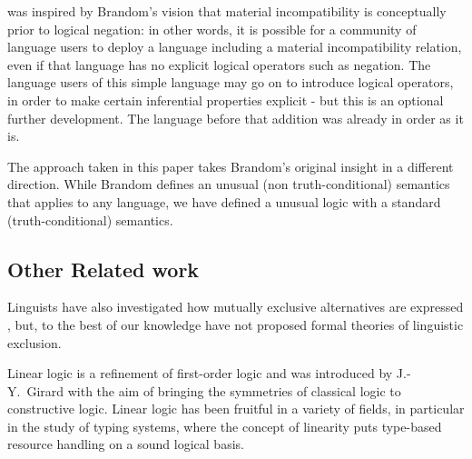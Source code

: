 \ELFULL{} was inspired by Brandom's vision that material incompatibility is conceptually prior to logical negation:
in other words, it is possible for a community of language users to deploy a language including a material incompatibility relation, even if that language has no explicit logical operators such as negation.
The language users of this simple language may go on to introduce logical operators, in order to make certain inferential properties explicit - but this is an optional further development. 
The language before that addition was already in order as it is.

The approach taken in this paper takes Brandom's original insight in a different direction.
While Brandom defines an unusual (non truth-conditional) semantics that applies to any language, we have defined a unusual logic with a standard (truth-conditional) semantics.






\subsection{Other Related work}

Linguists have also investigated how mutually exclusive alternatives
are expressed \cite{OKeeffeA:rouhanocl}, but, to the best of our knowledge have not
proposed formal theories of linguistic exclusion.

 Linear logic \cite{GirardJY:linlog,GirardJY:protyp} 
is a refinement of first-order logic and was introduced by
J.-Y.~Girard with the aim of bringing the symmetries of classical
logic to constructive logic. Linear logic has been fruitful in a
variety of fields, in particular in the study of typing systems, where
the concept of linearity puts type-based resource handling on a sound
logical basis.

